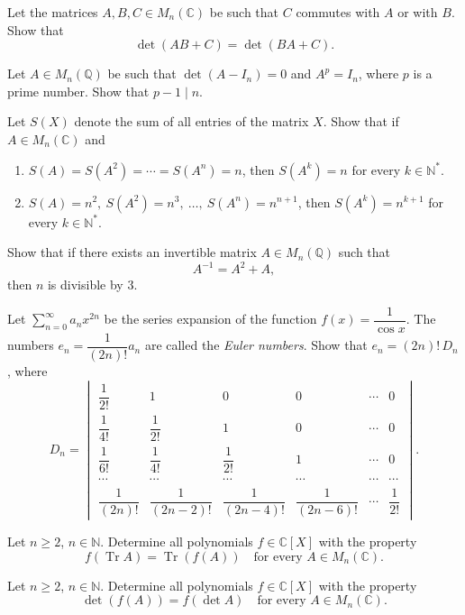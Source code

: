 \documentclass[12pt]{article}
\begin{document}
\begin{problems}
\item Let the matrices $A, B, C \in M_n(\mathbb{C})$ be such that $C$ commutes with $A$ or with $B$. Show that
$$\det(AB + C) = \det(BA + C).$$

\item Let $A \in M_n(\mathbb{Q})$ be such that $\det(A - I_n) = 0$ and $A^p = I_n$, where $p$ is a prime number. Show that $p - 1 \mid n$.

\item Let $S(X)$ denote the sum of all entries of the matrix $X$. Show that if $A \in M_n(\mathbb{C})$ and
\begin{enumerate}[label=(\alph*)]
\item $S(A) = S(A^2) = \cdots = S(A^n) = n$, then $S(A^k) = n$ for every $k \in \mathbb{N}^*$.
\item $S(A) = n^2,\ S(A^2) = n^3,\ \ldots,\ S(A^n) = n^{n+1}$, then $S(A^k) = n^{k+1}$ for every $k \in \mathbb{N}^*$.
\end{enumerate}

\item Show that if there exists an invertible matrix $A \in M_n(\mathbb{Q})$ such that
$$A^{-1} = A^2 + A,$$
then $n$ is divisible by $3$.

\item Let $\displaystyle\sum_{n=0}^{\infty} a_n x^{2n}$ be the series expansion of the function $f(x) = \dfrac{1}{\cos x}$. The numbers $e_n = \dfrac{1}{(2n)!} a_n$ are called the \emph{Euler numbers}. Show that $e_n = (2n)!\, D_n$, where
$$D_n = \begin{vmatrix}
\dfrac{1}{2!} & 1 & 0 & 0 & \cdots & 0 \\[6pt]
\dfrac{1}{4!} & \dfrac{1}{2!} & 1 & 0 & \cdots & 0 \\[6pt]
\dfrac{1}{6!} & \dfrac{1}{4!} & \dfrac{1}{2!} & 1 & \cdots & 0 \\[6pt]
\cdots & \cdots & \cdots & \cdots & \cdots & \cdots \\[6pt]
\dfrac{1}{(2n)!} & \dfrac{1}{(2n-2)!} & \dfrac{1}{(2n-4)!} & \dfrac{1}{(2n-6)!} & \cdots & \dfrac{1}{2!}
\end{vmatrix}.$$

\item Let $n \ge 2$, $n \in \mathbb{N}$. Determine all polynomials $f \in \mathbb{C}[X]$ with the property
$$f(\operatorname{Tr} A) = \operatorname{Tr}(f(A)) \quad \text{for every } A \in M_n(\mathbb{C}).$$

\item Let $n \ge 2$, $n \in \mathbb{N}$. Determine all polynomials $f \in \mathbb{C}[X]$ with the property
$$\det(f(A)) = f(\det A) \quad \text{for every } A \in M_n(\mathbb{C}).$$


\end{problems}
\end{document}
